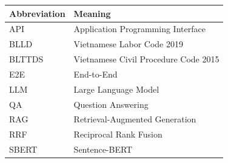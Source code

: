 \documentclass[11pt]{extarticle}
\begin{document}
\clearpage
\tableofcontents

\begin{table}[H]
  \centering
  \begin{tabular}{@{}ll@{}}
    \toprule
    Abbreviation & Meaning \\
    \midrule
    API & Application Programming Interface \\
    BLLD & Vietnamese Labor Code 2019 \\
    BLTTDS & Vietnamese Civil Procedure Code 2015 \\
    E2E & End-to-End \\
    LLM & Large Language Model \\
    QA & Question Answering \\
    RAG & Retrieval-Augmented Generation \\
    RRF & Reciprocal Rank Fusion \\
    SBERT & Sentence-BERT \\
    \bottomrule
  \end{tabular}
\end{table}

\clearpage
\listoftables

\clearpage
\listoffigures

\clearpage
{}








\clearpage
\printbibliography[heading=bibintoc,title={References}]

\appendix

\end{document}
